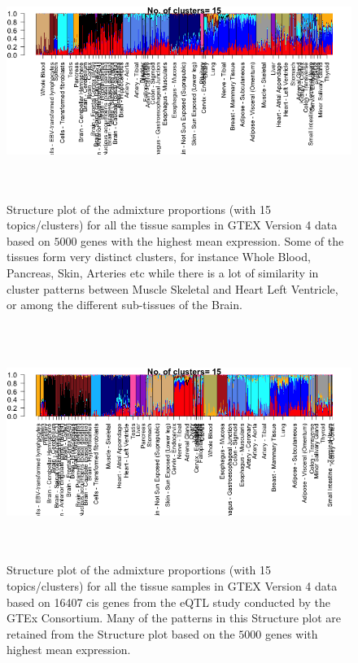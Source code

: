 \begin{figure}[ht]
	\raggedleft
	\includegraphics[height=3in, width=6.5in]{../plots/whole_tissue_structure_15.png}
        \caption{Structure plot of the admixture proportions (with 15 topics/clusters) for all the tissue samples in GTEX Version 4 data based on $5000$ genes with the highest mean expression. Some of the tissues form very distinct clusters, for instance Whole Blood, Pancreas, Skin, Arteries etc while there is a lot of similarity in cluster patterns between Muscle Skeletal and Heart Left Ventricle, or among the different sub-tissues of the Brain.}
\end{figure}

\begin{figure}[ht]
	\raggedleft
	\includegraphics[height=3in, width=6.5in]{../plots/whole_tissue_structure_15_thinned.png}
        \caption{Structure plot of the admixture proportions (with 15 topics/clusters) for all the tissue samples in GTEX Version 4 data based on 16407 cis genes from the eQTL study conducted by the GTEx Consortium. Many of the patterns in this Structure plot are retained from the Structure plot based on the $5000$ genes with highest mean expression. }
\end{figure}

